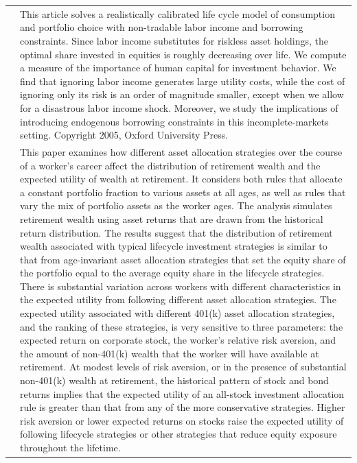 \documentclass{article}
\begin{document}
\begin{tabular}{p{}p{}}
\cite{Cocco_2005} & This article solves a realistically calibrated life cycle model of consumption and portfolio choice with non-tradable labor income and borrowing constraints. Since labor income substitutes for riskless asset holdings, the optimal share invested in equities is roughly decreasing over life. We compute a measure of the importance of human capital for investment behavior. We find that ignoring labor income generates large utility costs, while the cost of ignoring only its risk is an order of magnitude smaller, except when we allow for a disastrous labor income shock. Moreover, we study the implications of introducing endogenous borrowing constraints in this incomplete-markets setting. Copyright 2005, Oxford University Press. \\
\cite{Poterba_2006} & This paper examines how different asset allocation strategies over the course of a worker's career affect the distribution of retirement wealth and the expected utility of wealth at retirement. It considers both rules that allocate a constant portfolio fraction to various assets at all ages, as well as  rules that vary the mix of portfolio assets as the worker ages. The analysis simulates retirement wealth using asset returns that are drawn from the historical return distribution. The results suggest that the distribution of retirement wealth associated with typical lifecycle investment strategies is similar to that from age-invariant asset allocation strategies that set the equity share of the portfolio equal to the average equity share in the lifecycle strategies. There is substantial variation across workers with different characteristics in the expected utility from following different asset allocation strategies. The expected utility associated with different 401(k) asset allocation strategies, and the ranking of these strategies, is very sensitive to three parameters: the expected return on corporate stock, the worker's relative risk aversion, and the amount of non-401(k) wealth that the worker will have available at retirement. At modest levels of risk aversion, or in the presence of substantial non-401(k) wealth at retirement, the historical pattern of stock and bond returns implies that the expected utility of an all-stock investment allocation rule is greater than that from any of the more conservative strategies. Higher risk aversion or lower expected returns on stocks raise the expected utility of following lifecycle strategies or other strategies that reduce equity exposure throughout the lifetime. \\

\end{tabular}
\end{document}

